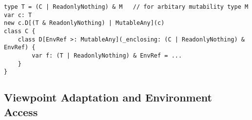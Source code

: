 \begin{lstlisting}[float=htbp, caption={Polymorphic Environment Reference}, label={lst:poly-env-ref-b}]
type T = (C | ReadonlyNothing) & M   // for arbitary mutability type M
var c: T
new c.D[(T & ReadonlyNothing) | MutableAny](c)
class C {
	class D[EnvRef >: MutableAny](_enclosing: (C | ReadonlyNothing) & EnvRef) {
		var f: (T | ReadonlyNothing) & EnvRef = ...
	}
}
\end{lstlisting}


\subsection{Viewpoint Adaptation and Environment Access}




\begin{comment}


Some translation is performed on constructor calls to handle synthetic outer references, and this translation is related to path-dependent types. In Dotty, types are {\em path-dependent}. The class name {\cd D} by itself is not a type; where~{\cd D} is used without a prefix path, an appropriate prefix path is assumed. (typically \mbox{\cd C.this}, where~{\cd C} is )

In general, for any class~{\cd D} that 

\begin{lstlisting}[float=htbp, caption={}, label={lst:}]
class C {
	class D(_enclosing: C) {
	}
	new D()
	new C.this.D()  // with explicit path prefix
	new C.this.D(C.this)  // with explicit outer reference
}
\end{lstlisting}




\begin{lstlisting}[float=htbp, caption={Method Transformation 4 (Flattening)}, label={lst:meth-4}]
class C { this =>
	val y = (new _M(this, x))._result
}
class _M(this: C, _x: S) = {
	val _outer = this
	val x = _x
	...
	val _result = resultExpr
}
\end{lstlisting}

\end{comment}
